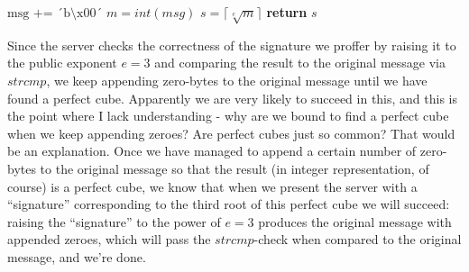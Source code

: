 \documentclass{article}
\begin{document}
\medskip

\begin{algorithm}
    \begin{algorithmic}[1]
    \State $\text{msg += ´b\textbackslash x00´}$
    \State $m = int(msg)$
    \State $s = \lceil \sqrt[e]{m} \rceil$
        \State \textbf{return} $s$
    \EndIf
    \EndWhile
    \end{algorithmic}\label{algo}
\end{algorithm}

Since the server checks the correctness of the signature we proffer by raising it to the public exponent $e=3$ and comparing the result to the original message via $strcmp$, we keep appending zero-bytes to the original message until we have found a perfect cube. Apparently we are very likely to succeed in this, and this is the point where I lack understanding - why are we bound to find a perfect cube when we keep appending zeroes? Are perfect cubes just so common? That would be an explanation. Once we have managed to append a certain number of zero-bytes to the original message so that the result (in integer representation, of course) is a perfect cube, we know that when we present the server with a ``signature'' corresponding to the third root of this perfect cube we will succeed: raising the ``signature'' to the power of $e=3$ produces the original message with appended zeroes, which will pass the $strcmp$-check when compared to the original message, and we're done.
\end{document}
